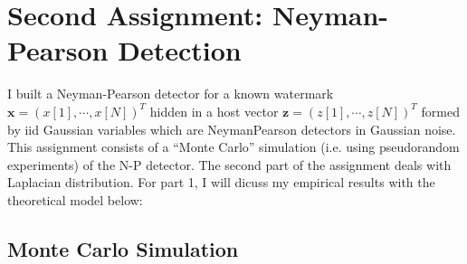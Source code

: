 \documentclass[]{assignment}
\begin{document}
\def\studentname{James Dorrian}
\def\ucdstudentnumber{13369451}





\maketitle

\newpage
\section{{\bf Second Assignment:} Neyman-Pearson Detection}

I built a Neyman-Pearson detector for a known watermark $\mathbf{x}=(x[1],\cdots,x[N])^T$ hidden in a host vector $\mathbf{z}=(z[1],\cdots,z[N])^T$ formed by iid Gaussian variables which are NeymanPearson detectors in Gaussian noise. This assignment consists of a ``Monte Carlo'' simulation (i.e.  using  pseudorandom experiments) of the N-P detector. The second part of the assignment deals with Laplacian distribution. For part 1, I will dicuss my empirical results with the theoretical model below:


\subsection{Monte Carlo Simulation}
\end{document}
